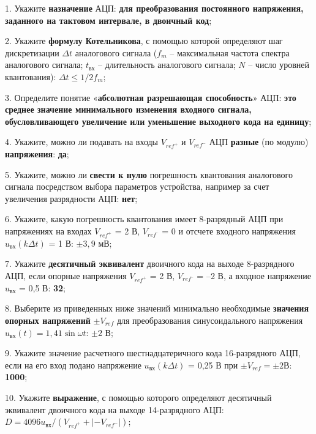 \documentclass[spec, och, otchet, hidelinks]{SCWorks}
\begin{document}
\par 1. Укажите \textbf{назначение} АЦП: \textbf{для преобразования постоянного напряжения, заданного на тактовом интервале, в двоичный код};

\par 2. Укажите \textbf{формулу Котельникова}, с помощью которой определяют шаг дискретизации $\Delta t$ аналогового сигнала ($f_m$ – максимальная 
частота спектра аналогового сигнала; $t_\text{вх}$ – длительность аналогового сигнала; $N$ – число уровней квантования): $\Delta t \leq 1 / 2f_m$;

\par 3. Определите понятие «\textbf{абсолютная разрешающая способность}» АЦП: \textbf{это среднее значение минимального изменения входного сигнала, 
	обусловливающего увеличение или уменьшение выходного кода на единицу};

\par 4. Укажите, можно ли подавать на входы $V_{ref^{+}}$ и $V_{ref^{-}}$ АЦП \textbf{разные} (по модулю) \textbf{напряжения}: \textbf{да};

\par 5. Укажите, можно ли \textbf{свести к нулю} погрешность квантования аналогового сигнала посредством выбора параметров устройства, например за счет 
увеличения разрядности АЦП: \textbf{нет};

\par 6. Укажите, какую погрешность квантования имеет 8-разрядный АЦП при напряжениях на входах $V_{ref^{+}}$ = 2 В, $V_{ref^{–}}$ = 0 и отсчете входного 
напряжения $u_\text{вх}(k\Delta t)$ = 1 В: $\pm 3,9$ мВ;

\par 7. Укажите \textbf{десятичный эквивалент} двоичного кода на выходе 8-разрядного АЦП, если опорные напряжения $V_{ref^{+}}$ = 2 В, $V_{ref^{–}}$ 
= –2 В, а входное напряжение $u_\text{вх}$ = 0,5 В: \textbf{32};

\par 8. Выберите из приведенных ниже значений минимально необходимые \textbf{значения опорных напряжений} $\pm V_{ref}$ для преобразования синусоидального 
напряжения $u_\text{вх}(t) = 1,41\sin \omega t$: $\pm 2$ В;

\par 9. Укажите значение расчетного шестнадцатеричного кода 16-разрядного АЦП, если на его вход подано напряжение $u_\text{вх}(k \Delta t)$ = 0,25 В 
при $ \pm V_{ref} = \pm 2 В$: \textbf{1000};

\par 10. Укажите \textbf{выражение}, с помощью которого определяют десятичный эквивалент двоичного кода на выходе 14-разрядного АЦП: 
$D = 4096u_\text{вх} / (V_{ref^{+}} + |-V_{ref^{-}}|)$;
\end{document}

